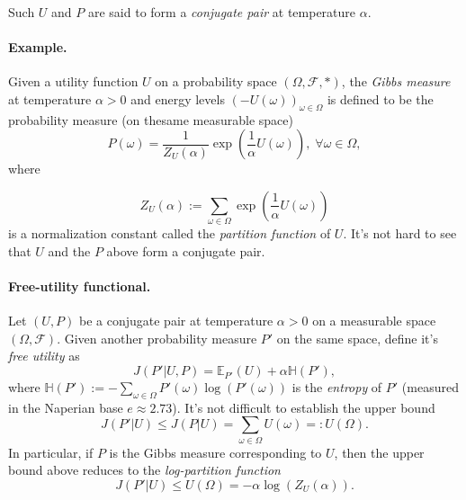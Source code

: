 \documentclass{article} %
\begin{document}
Such $U$ and $P$ are said to form a \textit{conjugate pair} at temperature $\alpha$.


\paragraph{Example.}
Given a utility function $U$ on a probability space $(\Omega, \mathcal F, *)$, the \textit{Gibbs measure} at temperature $\alpha > 0$ and energy levels $(-U(\omega))_{\omega \in \Omega}$ is defined to be the probability measure (on thesame measurable space)
  \begin{equation}
    P(\omega) = \frac{1}{Z_{U}(\alpha)}\exp\left(\frac{1}{\alpha}U(\omega)\right), \; \forall \omega \in \Omega,
  \end{equation}
  where

  \begin{equation}
    Z_{U}(\alpha) := \sum_{\omega \in \Omega}\exp\left(\frac{1}{\alpha}U(\omega)\right)
  \end{equation}
  is a normalization constant called the \textit{partition function} of $U$.
  It's not hard to see that $U$ and the $P$ above form a conjugate pair.

  \paragraph{Free-utility functional.}
    Let $(U, P)$ be a conjugate pair at temperature $\alpha > 0$  on a measurable space $(\Omega, \mathcal F)$. Given another probability measure $P'$ on the same space, define it's \textit{free utility} as
    \begin{equation}
      J(P'|U, P) = \mathbb E_{P'}(U) + \alpha \mathbb H(P'),
    \label{eq:free_u}
    \end{equation}
    where $\mathbb H(P') := -\sum_{\omega \in \Omega}P'(\omega)\log(P'(\omega))$ is the \textit{entropy} of $P'$ (measured in the Naperian base $e \approx 2.73$). It's not difficult to establish the upper bound
  \begin{equation}
    J(P'|U) \le J(P|U) = \sum_{\omega \in \Omega}U(\omega) =: U(\Omega).
  \end{equation}
  In particular, if $P$ is the Gibbs measure corresponding to $U$, then the upper bound above reduces to the \textit{log-partition function}
  \begin{equation}
    J(P'|U) \le U(\Omega) = -\alpha \log(Z_{U}(\alpha)).
    \end{equation}
\end{document}
